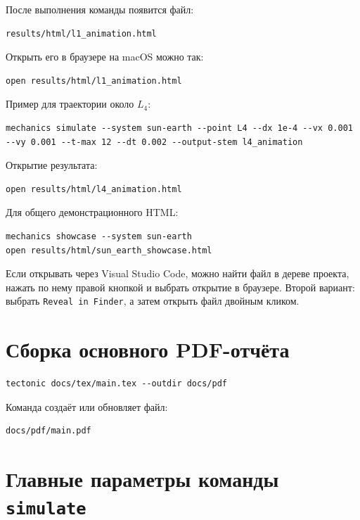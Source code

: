 \documentclass[a4paper,12pt]{article}
\begin{document}
После выполнения команды появится файл:

\begin{lstlisting}
results/html/l1_animation.html
\end{lstlisting}

Открыть его в браузере на macOS можно так:

\begin{lstlisting}
open results/html/l1_animation.html
\end{lstlisting}

Пример для траектории около $L_4$:

\begin{lstlisting}
mechanics simulate --system sun-earth --point L4 --dx 1e-4 --vx 0.001 --vy 0.001 --t-max 12 --dt 0.002 --output-stem l4_animation
\end{lstlisting}

Открытие результата:

\begin{lstlisting}
open results/html/l4_animation.html
\end{lstlisting}

Для общего демонстрационного HTML:

\begin{lstlisting}
mechanics showcase --system sun-earth
open results/html/sun_earth_showcase.html
\end{lstlisting}

Если открывать через Visual Studio Code, можно найти файл в дереве проекта,
нажать по нему правой кнопкой и выбрать открытие в браузере. Второй вариант:
выбрать \texttt{Reveal in Finder}, а затем открыть файл двойным кликом.

\section{Сборка основного PDF-отчёта}

\begin{lstlisting}
tectonic docs/tex/main.tex --outdir docs/pdf
\end{lstlisting}

Команда создаёт или обновляет файл:

\begin{lstlisting}
docs/pdf/main.pdf
\end{lstlisting}

\section{Главные параметры команды \texttt{simulate}}
\end{document}
